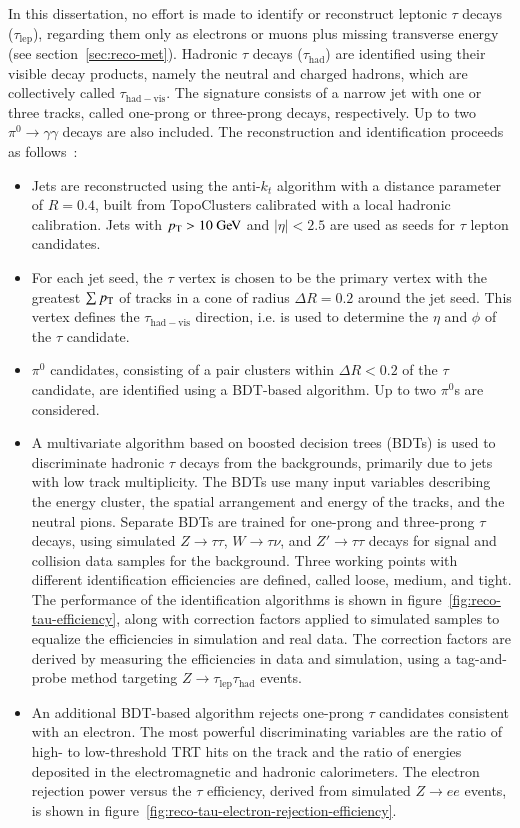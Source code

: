 In this dissertation, no effort is made to identify or reconstruct leptonic $\tau$ decays ($\tau_{\mathrm{lep}}$), regarding them only as electrons or muons plus missing transverse energy (see section~\ref{sec:reco-met}). Hadronic $\tau$ decays ($\tau_{\mathrm{had}}$) are identified using their visible decay products, namely the neutral and charged hadrons, which are collectively called $\tau_{\mathrm{had-vis}}$. The signature consists of a narrow jet with one or three tracks, called one-prong or three-prong decays, respectively. Up to two $\pi^0\rightarrow\gamma\gamma$ decays are also included. The reconstruction and identification proceeds as follows~\cite{TheATLASCollaboration:2014tga}:

\begin{itemize}
	\item Jets are reconstructed using the anti-$k_t$ algorithm with a distance parameter of $R=0.4$, built from TopoClusters calibrated with a local hadronic calibration. Jets with $\pt>10 \GeV$ and $|\eta|<2.5$ are used as seeds for $\tau$ lepton candidates.
	\item For each jet seed, the $\tau$ vertex is chosen to be the primary vertex with the greatest $\sum p_{\text{T}}$ of tracks in a cone of radius $\Delta R=0.2$ around the jet seed. This vertex defines the $\tau_{\mathrm{had-vis}}$ direction, i.e. is used to determine the $\eta$ and $\phi$ of the $\tau$ candidate. 
	\item $\pi^0$ candidates, consisting of a pair clusters within $\Delta R<0.2$ of the $\tau$ candidate, are identified using a BDT-based algorithm. Up to two $\pi^0$s are considered.
	\item A multivariate algorithm based on boosted decision trees (BDTs) is used to discriminate hadronic $\tau$ decays from the backgrounds, primarily due to jets with low track multiplicity. The BDTs use many input variables describing the energy cluster, the spatial arrangement and energy of the tracks, and the neutral pions. Separate BDTs are trained for one-prong and three-prong $\tau$ decays, using simulated $Z\rightarrow\tau\tau$, $W\rightarrow \tau\nu$, and $Z'\rightarrow\tau\tau$ decays for signal and collision data samples for the background. Three working points with different identification efficiencies are defined, called loose, medium, and tight. The performance of the identification algorithms is shown in figure~\ref{fig:reco-tau-efficiency}, along with correction factors applied to simulated samples to equalize the efficiencies in simulation and real data. The correction factors are derived by measuring the efficiencies in data and simulation, using a tag-and-probe method targeting $Z\rightarrow\tau_{\mathrm{lep}}\tau_{\mathrm{had}}$ events.
	\item An additional BDT-based algorithm rejects one-prong $\tau$ candidates consistent with an electron. The most powerful discriminating variables are the ratio of high- to low-threshold TRT hits on the track and the ratio of energies deposited in the electromagnetic and hadronic calorimeters. The electron rejection power versus the $\tau$ efficiency, derived from simulated $Z\rightarrow ee$ events, is shown in figure~\ref{fig:reco-tau-electron-rejection-efficiency}.  
\end{itemize}

